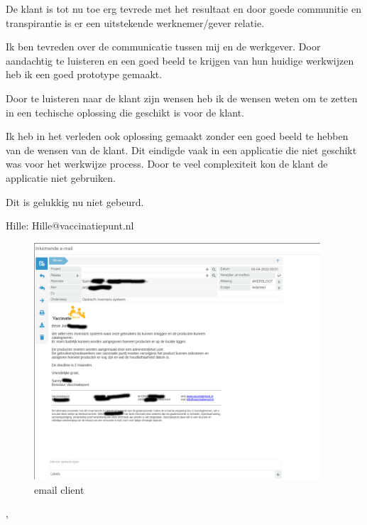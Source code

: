 {{{			De klant is tot nu toe erg tevrede met het resultaat en door goede communitie en transpirantie is er een uitstekende werknemer/gever relatie.
		}
		{%
			Ik ben tevreden over de communicatie tussen mij en de werkgever.
			Door aandachtig te luisteren en een goed beeld te krijgen van hun huidige werkwijzen heb ik een goed prototype gemaakt.

			Door te luisteren naar de klant zijn wensen heb ik de wensen weten om te zetten in een techische oplossing die geschikt is voor de klant.

			Ik heb in het verleden ook oplossing gemaakt zonder een goed beeld te hebben van de wensen van de klant.
			Dit eindigde vaak in een applicatie die niet geschikt was voor het werkwijze process.
			Door te veel complexiteit kon de klant de applicatie niet gebruiken.

			Dit is gelukkig nu niet gebeurd.
		}
		{
			Hille: Hille@vaccinatiepunt.nl
		}
	}
	{%

		\begin{figure}
			\begin{center}
				\includegraphics[width=0.95\textwidth]{images/email.png}
			\end{center}
			\caption{email client}
			\label{fig:emailclient}
		\end{figure}
	},
}

